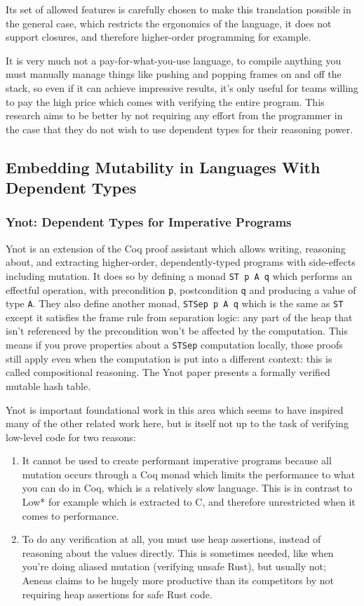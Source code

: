 \documentclass[12pt,twoside]{report}
\begin{document}
Its set of allowed features is carefully chosen to make this translation possible in the general case, which restricts the ergonomics of the language, it does not support closures, and therefore higher-order programming for example.

It is very much not a pay-for-what-you-use language, to compile anything you must manually manage things like pushing and popping frames on and off the stack, so even if it can achieve impressive results, it's only useful for teams willing to pay the high price which comes with verifying the entire program. This research aims to be better by not requiring any effort from the programmer in the case that they do not wish to use dependent types for their reasoning power.

\subsection{Embedding Mutability in Languages With Dependent Types}

\subsubsection{Ynot: Dependent Types for Imperative Programs}
Ynot\cite{nanevski_ynot_2008} is an extension of the Coq proof assistant which allows writing, reasoning about, and extracting higher-order, dependently-typed programs with side-effects including mutation. It does so by defining a monad \verb|ST p A q| which performs an effectful operation, with precondition \verb|p|, postcondition \verb|q| and producing a value of type \verb|A|. They also define another monad, \verb|STSep p A q| which is the same as \verb|ST| except it satisfies the frame rule from separation logic: any part of the heap that isn't referenced by the precondition won't be affected by the computation. This means if you prove properties about a \verb|STSep| computation locally, those proofs still apply even when the computation is put into a different context: this is called compositional reasoning. The Ynot paper presents a formally verified mutable hash table.

Ynot is important foundational work in this area which seems to have inspired many of the other related work here, but is itself not up to the task of verifying low-level code for two reasons:

\begin{enumerate}
  \item It cannot be used to create performant imperative programs because all mutation occurs through a Coq monad which limits the performance to what you can do in Coq, which is a relatively slow language. This is in contrast to Low*\cite{protzenko_low_2017} for example which is extracted to C, and therefore unrestricted when it comes to performance.
  \item To do any verification at all, you must use heap assertions, instead of reasoning about the values directly. This is sometimes needed, like when you're doing aliased mutation (verifying unsafe Rust), but usually not; Aeneas\cite{aeneas} claims to be hugely more productive than its competitors by not requiring heap assertions for safe Rust code.
\end{enumerate}
\end{document}
